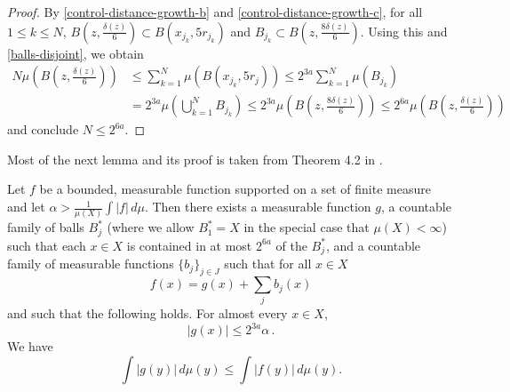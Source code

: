 \begin{proof}
By \eqref{control-distance-growth-b} and \eqref{control-distance-growth-c}, for all $1\le k \le N$, $B(z,\frac{\delta(z)}{6}) \subset B(x_{j_k}, 5r_{j_k})$ and $B_{j_k} \subset B(z,\frac{8\delta(z)}{6})$. Using this and \eqref{balls-disjoint}, we obtain
\begin{align}
    N \mu(B(z,\frac{\delta(z)}{6})) &\le \sum_{k=1}^N \mu(B(x_{j_k}, 5r_j)) \le 2^{3a} \sum_{k=1}^N \mu(B_{j_k}) \\
    &= 2^{3a} \mu(\bigcup_{k=1}^N B_{j_k}) \le 2^{3a} \mu(B(z,\frac{8\delta(z)}{6})) \le 2^{6a} \mu(B(z,\frac{\delta(z)}{6}))
\end{align}
and conclude $N\le 2^{6a}$.
\end{proof}

Most of the next lemma and its proof is taken from Theorem 4.2 in \cite{stein-book}.
\begin{lemma}
    \label{Calderon-Zygmund-decomposition}
    \leanok
    Let $f$ be a bounded, measurable function supported on a set of finite measure and let $\alpha>\frac{1}{\mu(X)}\int |f|\,d\mu$.
    Then there exists a measurable function $g$, a countable family of balls $B_j^*$ (where we allow $B_1^* = X$ in the special case that $\mu(X)<\infty$)
    such that each $x\in X$ is contained in at most $2^{6a}$ of the $B_j^*$, and a countable family of measurable functions $\{b_j\}_{j\in J}$ such that for all $x \in X$
    \begin{equation}
       \label{eq-gb-dec}
       f(x)= g(x) + \sum_{j} b_j(x)
    \end{equation}
    and such that the following holds. For almost every $x\in X$,
    \begin{equation}
        \label{eq-g-max}
       |g(x)|\leq 2^{3a} \alpha\,.
    \end{equation}
    We have
    \begin{equation}
        \label{eq-g-L1-norm}
        \int |g(y)|\, d\mu(y)\leq \int |f(y)|\, d\mu(y).
    \end{equation}

\end{lemma}
